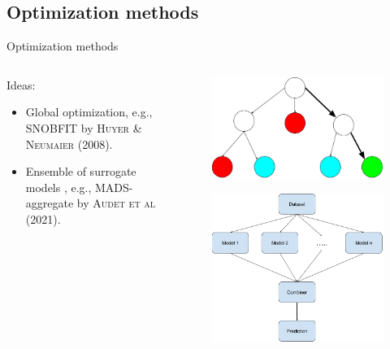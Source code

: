 \documentclass{beamer}
\begin{document}
\subsection{Optimization methods}
\begin{frame}{Optimization methods}
    \begin{columns}
        \begin{column}{0.6\textwidth}
        Ideas:
             \begin{itemize}
                \item Global optimization, e.g., SNOBFIT by \textsc{Huyer \& Neumaier} (2008).
                \item Ensemble of surrogate models , e.g., MADS-aggregate by \textsc{Audet et al} (2021).
            \end{itemize}
        \end{column}
        \begin{column}{0.5\textwidth}
            \begin{figure}[h]
                \includegraphics[scale=0.17]{img/slide/BnB.png}
                \label{fig:perform}
            \end{figure}
            \vspace{0.1cm}
            \begin{figure}[h]
                \includegraphics[scale=0.2]{img/slide/ensemble.png}

\end{figure}
\end{column}
\end{columns}
\end{frame}
\end{document}
